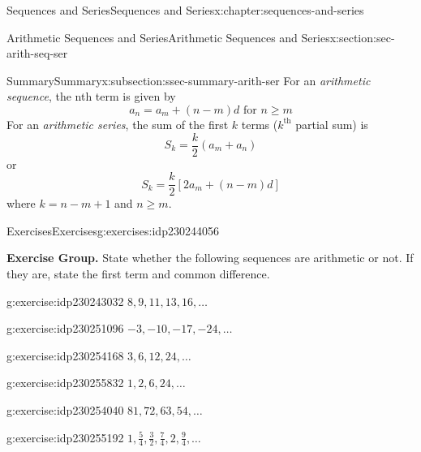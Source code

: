 \documentclass[twoside,10pt,]{book}
\numberwithin{equation}{section}
\newcommand{\kth}{{k^{\text{th}}}}
\begin{document}
\begin{chapterptx}{Sequences and Series}{}{Sequences and Series}{}{}{x:chapter:sequences-and-series}
\begin{sectionptx}{Arithmetic Sequences and Series}{}{Arithmetic Sequences and Series}{}{}{x:section:sec-arith-seq-ser}
\begin{subsectionptx}{Summary}{}{Summary}{}{}{x:subsection:ssec-summary-arith-ser}
For an \emph{arithmetic sequence}, the nth term is given by%
\begin{equation*}
a_n = a_m + \left(n - m \right)d \text{   for } n \ge m
\end{equation*}
For an \emph{arithmetic series}, the sum of the first \(k\) terms (\(\kth{}\) partial sum) is%
\begin{equation*}
S_k = \frac{k}{2}\left(a_m + a_n \right)
\end{equation*}
or%
\begin{equation*}
S_k = \frac{k}{2}\left[ 2a_m + \left(n - m \right)d \right]
\end{equation*}
where \(k=n-m+1\) and \(n\ge m\).%
\end{subsectionptx}
%
%
\typeout{************************************************}
\typeout{************************************************}
%
\begin{exercises-subsection}{Exercises}{}{Exercises}{}{}{g:exercises:idp230244056}
\par\medskip\noindent%
\textbf{Exercise Group.}\space\space%
State whether the following sequences are arithmetic or not.  If they are, state the first term and common difference.\begin{exercisegroup}
\begin{divisionexerciseeg}{1}{}{}{g:exercise:idp230243032}%
\(8, 9, 11, 13, 16, \ldots\)\end{divisionexerciseeg}%
\begin{divisionexerciseeg}{2}{}{}{g:exercise:idp230251096}%
\(-3, -10, -17, -24, \ldots\)\end{divisionexerciseeg}%
\begin{divisionexerciseeg}{3}{}{}{g:exercise:idp230254168}%
\(3, 6, 12, 24, \ldots\)\end{divisionexerciseeg}%
\begin{divisionexerciseeg}{4}{}{}{g:exercise:idp230255832}%
\(1, 2, 6, 24, \ldots\)\end{divisionexerciseeg}%
\begin{divisionexerciseeg}{5}{}{}{g:exercise:idp230254040}%
\(81, 72, 63, 54, \ldots\)\end{divisionexerciseeg}%
\begin{divisionexerciseeg}{6}{}{}{g:exercise:idp230255192}%
\(1,\frac{5}{4},\frac{3}{2},\frac{7}{4},2,\frac{9}{4},\ldots\)\end{divisionexerciseeg}%
\end{exercisegroup}
\par\medskip\noindent

\end{exercises-subsection}
\end{sectionptx}
\end{chapterptx}
\end{document}
